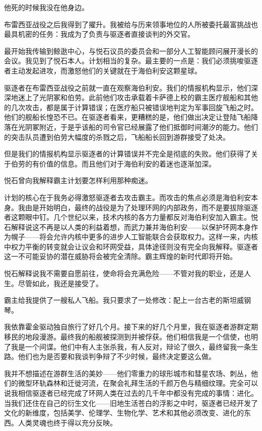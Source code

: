\documentclass[AutoFakeBold=true]{book}
\begin{document}
{他死的时候我没在他身边。

布雷西亚战役之后我得到了擢升。我被给与历来领事地位的人所被委托最富挑战也最具机密的任务：我成为了负责与驱逐者直接谈判的外交官。

最开始我传输到鲸逖中心，与悦石议员的委员会和一部分人工智能顾问展开漫长的会议。我见到了悦石本人。计划相当的复杂。最主要的一点是：我们必须挑唆驱逐者主动发起进攻，而激怒他们的关键就在于海伯利安这颗星球。

驱逐者在布雷西亚战役之前就一直在观察海伯利安。我们的情报机构显示，他们深深地迷上了光阴冢和伯劳。此前他们攻击承载着卡萨德上校的霸主医疗舰船和其他的几次攻击，都是属于计算错误；在医疗船只被错误地判定为军事回旋飞船之时。他们的舰船长惶恐不已。在驱逐者看来，更糟糕的是，他们做出决定让登陆飞船降落在光阴冢附近，于是乎该船的司令官已经展露了他们抵御时间潮汐的能力。他们的突击队员遭到伯劳大幅度的杀戮之后，飞船船长回到游群接受了处决。

但是我们的情报机构显示驱逐者的计算错误并不完全是彻底的失败。他们获得了关于伯劳的有价值的信息。而且他们对于海伯利安的着迷也逐渐加深。

悦石曾向我解释霸主计划要怎样利用那种痴迷。

计划的核心在于我务必得激怒驱逐者去攻击霸主。而攻击的焦点必须是海伯利安本身。我由是开始明白，最终的战役是为了处理环网的内部政务，而不是要拔除驱逐者这颗眼中钉。几个世纪以来，技术内核的各方力量都反对海伯利安加入霸主。悦石解释说这不再是以人类的利益着想，而武力兼并海伯利安——以保护环网本身作为幌子——将会允许内核中更多的进步人工智能联合会获取权力。这样一来，内核中权力平衡的转变就会让议会和环网受益，具体途径则没有完全向我解释。驱逐者这一不可能妥协的潜在威胁将会被完全清除。霸主辉煌的新时代即将开始。

悦石解释说我不需要自愿前往，使命将会充满危险——不管对我的职业，还是人生。尽管如此，我还是接受了。

霸主给我提供了一艘私人飞船。我只要求了一处修改：配上一台古老的斯坦威钢琴。

我依靠霍金驱动独自旅行了好几个月。接下来的好几个月里，我在驱逐者游群定期移民的地段漫游。最终我的船舰被探测到并被俘获。他们相信我是一个信使，也明了我是一个间谍。他们中有人主张杀我，有人反对，辩论了很久，最终留我一条生路。他们也为是否要和我谈判争辩了不少时候，最终决定要这么做。

我并不想描述在游群生活的美妙——他们零重力的球形城市和彗星农场、刺丛，他们的微型环轨森林和迁徙河流，在聚会礼拜生活的千颜万色与精细纹理。完全可以说我相信驱逐者已经完成了环网人类在过去的几千年中都没有完成的事情：进化。当我们还住在自己的衍生文化——旧地生活苍白的浮影之中时，驱逐者已经开发了文化的新维度，包括美学、伦理学、生物化学、艺术和其他必须改变、进化的东西。人类灵魂也终于得以充分反映。

}
\end{document}
